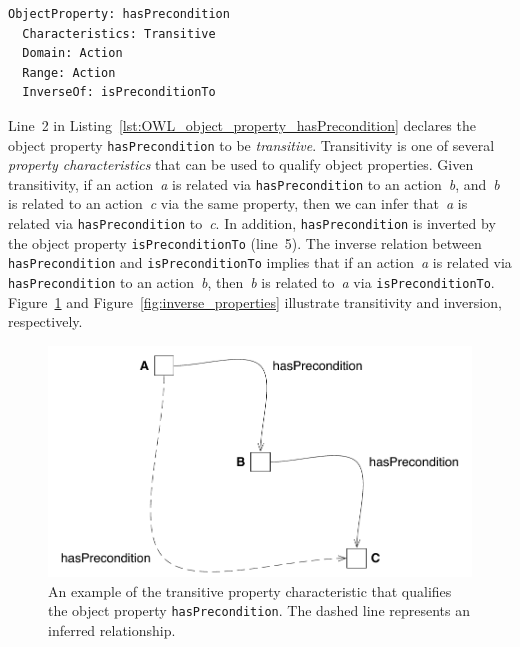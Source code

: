 \begin{lstlisting}[caption={OWL code for the object property \texttt{hasPrecondition}},label=lst:OWL_object_property_hasPrecondition]
ObjectProperty: hasPrecondition
  Characteristics: Transitive
  Domain: Action
  Range: Action
  InverseOf: isPreconditionTo
\end{lstlisting}

Line~2 in Listing~\ref{lst:OWL_object_property_hasPrecondition} declares the object property \texttt{hasPrecondition} to be \emph{transitive}. Transitivity is one of several \emph{property characteristics} that can be used to qualify object properties. Given transitivity, if an action~\emph{a} is related via \texttt{hasPrecondition} to an action~\emph{b}, and~\emph{b} is related to an action~\emph{c} via the same property, then we can infer that~\emph{a} is related via \texttt{hasPrecondition} to~\emph{c}. In addition, \texttt{hasPrecondition} is inverted by the object property \texttt{isPreconditionTo} (line~5). The inverse relation between \texttt{hasPrecondition} and \texttt{isPreconditionTo} implies that if an action~\emph{a} is related via \texttt{hasPrecondition} to an action~\emph{b}, then~\emph{b} is related to~\emph{a} via \texttt{isPreconditionTo}. Figure~\ref{fig:transitive_properties} and Figure~\ref{fig:inverse_properties} illustrate transitivity and inversion, respectively.

\begin{figure}[ht]
\centering
\includegraphics[scale=0.58]{img/transitive-properties.pdf}
\caption[Transitive properties]{An example of the transitive property characteristic that qualifies the object property \texttt{hasPrecondition}. The dashed line represents an inferred relationship.}
\label{fig:transitive_properties}
\end{figure}

